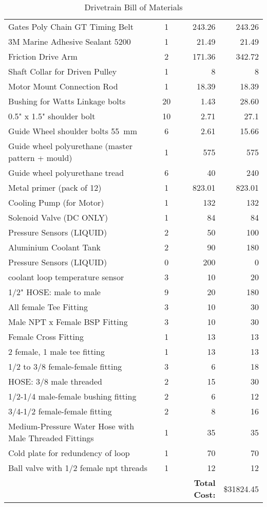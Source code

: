 \documentclass[main.tex]{subfiles}
\begin{document}
\begin{table}[H]
\begin{tabular}{@{}lcrr@{}}
    Gates Poly Chain GT Timing Belt & 1 & 243.26 & 243.26 \\
	3M Marine Adhesive Sealant 5200 & 1 & 21.49 & 21.49 \\
	Friction Drive Arm & 2 & 171.36 & 342.72 \\
	Shaft Collar for Driven Pulley & 1 & 8 & 8 \\
	Motor Mount Connection Rod & 1 & 18.39 & 18.39 \\
	Bushing for Watts Linkage bolts & 20 & 1.43 & 28.60 \\
	0.5" x 1.5" shoulder bolt & 10 & 2.71 & 27.1 \\
	Guide Wheel shoulder bolts \SI{55}{mm} & 6 & 2.61 & 15.66 \\
	Guide wheel polyurethane (master pattern + mould) & 1 & 575 & 575 \\
	Guide wheel polyurethane tread & 6 & 40 & 240 \\
	Metal primer (pack of 12) & 1 & 823.01 & 823.01 \\
	Cooling Pump (for Motor) & 1 & 132 & 132 \\
	Solenoid Valve (DC ONLY) & 1 & 84 & 84 \\
	Pressure Sensors (LIQUID) & 2 & 50 & 100 \\
	Aluminium Coolant Tank & 2 & 90 & 180 \\
	Pressure Sensors (LIQUID) & 0 & 200 & 0 \\
	coolant loop temperature sensor & 3 & 10 & 20 \\
	1/2" HOSE: male to male & 9 & 20 & 180 \\
	All female Tee Fitting & 3 & 10 & 30 \\
	Male NPT x Female BSP Fitting & 3 & 10 & 30 \\
	Female Cross Fitting & 1 & 13 & 13 \\
	2 female, 1 male tee fitting & 1 & 13 & 13 \\
	1/2 to 3/8 female-female fitting & 3 & 6 & 18 \\
	HOSE: 3/8 male threaded & 2 & 15 & 30 \\
	1/2-1/4 male-female bushing fitting & 2 & 6 & 12 \\
	3/4-1/2 female-female fitting & 2 & 8 & 16 \\
    Medium-Pressure Water Hose with Male Threaded Fittings & 1 & 35 & 35 \\
    Cold plate for redundency of loop & 1 & 70 & 70 \\
	Ball valve with 1/2 female npt threads & 1 & 12 & 12 \\
  		\midrule
          & & \textbf{Total Cost:} & \$31824.45 \\ \bottomrule
        \end{tabular}
        \caption{Drivetrain Bill of Materials}
        \label{friction-drive-bom}
\end{table}
\end{document}
